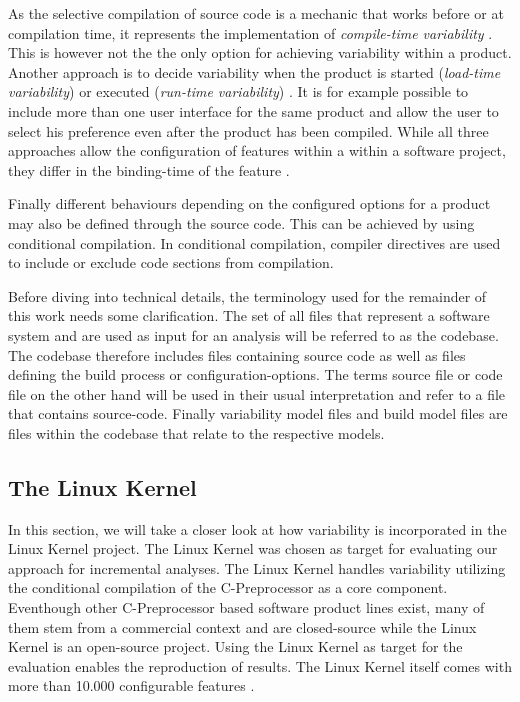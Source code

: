 \documentclass[a4paper]{article}
\begin{document}
As the selective compilation of source code is a mechanic that works before or at compilation time, it represents the implementation of \emph{compile-time variability} \cite[p.49]{Apel:2013:FSP:2541773}. This is however not the the only option for achieving variability within a product. Another approach is to decide variability when the product is started (\emph{load-time variability}) or executed (\emph{run-time variability}) \cite[p.49]{Apel:2013:FSP:2541773}. It is for example possible to include more than one user interface for the same product and allow the user to select his preference even after the product has been compiled. While all three approaches allow the configuration of features within a within a software project, they differ in the binding-time of the feature \cite[p.48f]{Apel:2013:FSP:2541773}. 

Finally different behaviours depending on the configured options for a product may also be defined through the source code. This can be achieved by using conditional compilation. In conditional compilation, compiler directives are used to include or exclude code sections from compilation. 

Before diving into technical details, the terminology used for the remainder of this work needs some clarification. The set of all files  that represent a software system and are used as input for an analysis will be referred to as the codebase. The codebase therefore includes files containing source code as well as files defining the build process or configuration-options. The terms source file or code file on the other hand will be used in their usual interpretation and refer to a file that contains source-code. Finally variability model files and build model files are files within the codebase that relate to the respective models. 

\subsection{The Linux Kernel}\label{linux-kernel}

In this section, we will take a closer look at how variability is incorporated in the Linux Kernel project. The Linux Kernel was chosen as target for evaluating our approach for incremental analyses. The Linux Kernel handles variability utilizing the conditional compilation of the C-Preprocessor as a core component.  Eventhough other C-Preprocessor based software product lines exist, many of them stem from a commercial context and are closed-source while the Linux Kernel is an open-source project. Using the Linux Kernel as target for the evaluation enables the reproduction of results. The Linux Kernel itself comes with more than 10.000 configurable features \cite{Tartler:2011:FCC:1966445.1966451}. 
\end{document}
